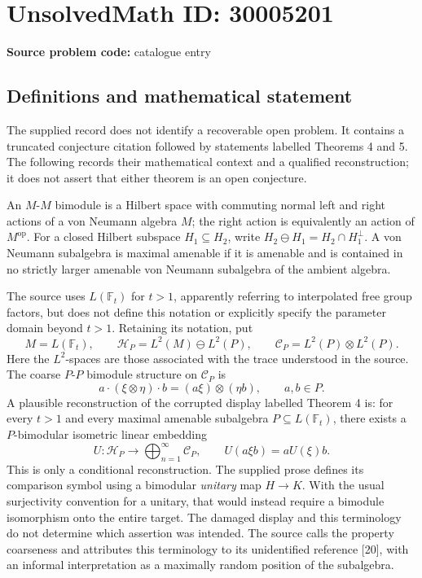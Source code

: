 \documentclass[11pt]{article}
\begin{document}
\section*{UnsolvedMath ID: 30005201}
\textbf{Source problem code:} catalogue entry
\subsection{Definitions and mathematical statement}
The supplied record does not identify a recoverable open problem. It contains a truncated conjecture citation followed by statements labelled Theorems 4 and 5. The following records their mathematical context and a qualified reconstruction; it does not assert that either theorem is an open conjecture.

An \(M\)-\(M\) bimodule is a Hilbert space with commuting normal left and right actions of a von Neumann algebra \(M\); the right action is equivalently an action of \(M^{\mathrm{op}}\). For a closed Hilbert subspace \(H_1\subseteq H_2\), write \(H_2\ominus H_1=H_2\cap H_1^\perp\). A von Neumann subalgebra is maximal amenable if it is amenable and is contained in no strictly larger amenable von Neumann subalgebra of the ambient algebra.

The source uses \(L(\mathbb F_t)\) for \(t>1\), apparently referring to interpolated free group factors, but does not define this notation or explicitly specify the parameter domain beyond \(t>1\). Retaining its notation, put
\[
 M=L(\mathbb F_t),\qquad
 \mathcal H_P=L^2(M)\ominus L^2(P),\qquad
 \mathcal C_P=L^2(P)\otimes L^2(P).
\]
Here the \(L^2\)-spaces are those associated with the trace understood in the source. The coarse \(P\)-\(P\) bimodule structure on \(\mathcal C_P\) is
\[
 a\cdot(\xi\otimes\eta)\cdot b=(a\xi)\otimes(\eta b),
 \qquad a,b\in P.
\]
A plausible reconstruction of the corrupted display labelled Theorem 4 is: for every \(t>1\) and every maximal amenable subalgebra \(P\subseteq L(\mathbb F_t)\), there exists a \(P\)-bimodular isometric linear embedding
\[
 U:\mathcal H_P\longrightarrow\bigoplus_{n=1}^{\infty}\mathcal C_P,
 \qquad U(a\xi b)=aU(\xi)b.
\]
This is only a conditional reconstruction. The supplied prose defines its comparison symbol using a bimodular \emph{unitary} map \(H\to K\). With the usual surjectivity convention for a unitary, that would instead require a bimodule isomorphism onto the entire target. The damaged display and this terminology do not determine which assertion was intended. The source calls the property coarseness and attributes this terminology to its unidentified reference [20], with an informal interpretation as a maximally random position of the subalgebra.
\end{document}
